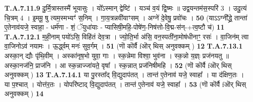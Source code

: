 \documentclass[17pt]{extarticle}
\begin{document}
                  \newline
                                                                  \textbf{ T.A.7.11.9} \newline
                  दु॒र्मि॒त्रास्तस्मै॑ भूयासुः । यो᳚ऽस्मान् द्वेष्टि॑ ।  यञ्च॑ व॒यं द्वि॒ष्मः ॥ उद्व॒यन्तम॑स॒स्परि॑ {3} । उदु॒त्यं चि॒त्रम् {4} । इ॒ममू॒ षु त्यम॒स्मभ्यꣳ॑ स॒निम् । गा॒य॒त्रन्नवी॑याꣳसम् ।  अग्ने॑ दे॒वेषु॒ प्रवो॑चः । \textbf{ 50} \newline
                  \newline
                                                        (याऽऽग्नी᳚द्ध्रे॒ तान्ता॑ ए॒तेनाव॑यजे॒ स्वाहा॒ - धर्म॑णा - शं॒ ॅयुधा॑याः - प्यासिषी॒महि॒-पोषे॑ण॒-निष॑त्तो-वि॒द्म-स॑न्-+त्व॒ष्टौ च॑) \textbf{11} \newline \newline
                                \textbf{ T.A.7.12.1} \newline
                  म॒ही॒नाम् पयो॑ऽसि॒ विहि॑तं देव॒त्रा ।  ज्यो॒ति॒र्भा अ॑सि॒ वन॒स्पती॑ना॒मोष॑धीनाꣳ॒॒ रसः॑ ।  वा॒जिन॑म् त्वा वा॒जिनोऽव॑ नयामः ।  ऊ॒र्द्ध्वम् मनः॑ सुव॒र्गम् । \textbf{ 51} \newline
                  \newline
                                                        (णॊ कॊर्वै fऒर् थिस् अनुवक्कम् ) \textbf{12} \newline \newline
                                \textbf{ T.A.7.13.1} \newline
                  अस्का॒न् द्यौः पृ॑थि॒वीम् । अस्का॑नृष॒भो युवा॒ गाः ।  स्क॒न्नेमा विश्वा॒ भुव॑ना । स्क॒न्नो य॒ज्ञ्ः प्रज॑नयतु ॥ अस्का॒नज॑नि॒ प्राज॑नि । आ स्क॒न्नाज्जा॑यते॒ वृषा᳚ ।  स्क॒न्नात् प्रज॑निषीमहि । \textbf{ 52} \newline
                  \newline
                                                        (णॊ कॊर्वै fऒर् थिस् अनुवक्कम् ) \textbf{13} \newline \newline
                                \textbf{ T.A.7.14.1} \newline
                  या पु॒रस्ता᳚द् वि॒द्युदाप॑तत् । तान्त॑ ए॒तेनाव॑ यजे॒ स्वाहा᳚ । या द॑क्षिण॒तः । या प॒श्चात् । योत्त॑र॒तः । योपरि॑ष्टाद् वि॒द्युदाप॑तत् । तान्त॑ ए॒तेनाव॑ यजे॒ स्वाहा᳚ । \textbf{ 53} \newline
                  \newline
                                                        (णॊ कॊर्वै fऒर् थिस् अनुवक्कम् ) \textbf{14} \newline \newline
\end{document}
